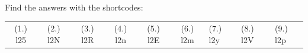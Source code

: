       
    
  \label{m38819**end}
          
       
    
  \label{59e414b70efc194a27a122db47d06ce6**end}
    
\par {} Find the answers with the shortcodes:
 \par \begin{tabular}[h]{cccccc}
 (1.) l25  &  (2.) l2N  &  (3.) l2R  &  (4.) l2n  &  (5.) l2E  &  (6.) l2m  &  (7.) l2y  &  (8.) l2V  &  (9.) l2p  & \end{tabular}



